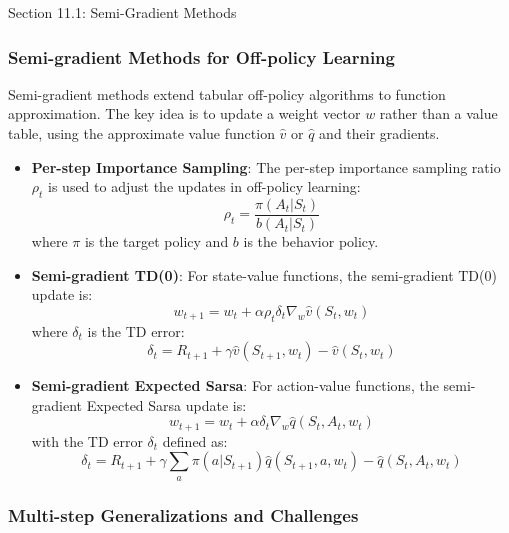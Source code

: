 \begin{notes}{Section 11.1: Semi-Gradient Methods}
\begin{highlight}
    \end{highlight}
    
    \subsubsection*{Semi-gradient Methods for Off-policy Learning}
    
    Semi-gradient methods extend tabular off-policy algorithms to function approximation. The key idea is to update a weight vector $w$ rather than a value table, using the approximate value function 
    $\hat{v}$ or $\hat{q}$ and their gradients.
    
    \begin{highlight}
    
        \begin{itemize}
            \item \textbf{Per-step Importance Sampling}: The per-step importance sampling ratio $\rho_t$ is used to adjust the updates in off-policy learning:
            \[
            \rho_t = \frac{\pi(A_t | S_t)}{b(A_t | S_t)}
            \]
            where $\pi$ is the target policy and $b$ is the behavior policy.
            \item \textbf{Semi-gradient TD(0)}: For state-value functions, the semi-gradient TD(0) update is:
            \[
            w_{t+1} = w_t + \alpha \rho_t \delta_t \nabla_w \hat{v}(S_t, w_t)
            \]
            where $\delta_t$ is the TD error:
            \[
            \delta_t = R_{t+1} + \gamma \hat{v}(S_{t+1}, w_t) - \hat{v}(S_t, w_t)
            \]
            \item \textbf{Semi-gradient Expected Sarsa}: For action-value functions, the semi-gradient Expected Sarsa update is:
            \[
            w_{t+1} = w_t + \alpha \delta_t \nabla_w \hat{q}(S_t, A_t, w_t)
            \]
            with the TD error $\delta_t$ defined as:
            \[
            \delta_t = R_{t+1} + \gamma \sum_a \pi(a | S_{t+1}) \hat{q}(S_{t+1}, a, w_t) - \hat{q}(S_t, A_t, w_t)
            \]
        \end{itemize}
    
    \end{highlight}
    
    \subsubsection*{Multi-step Generalizations and Challenges}
    

\end{notes}
